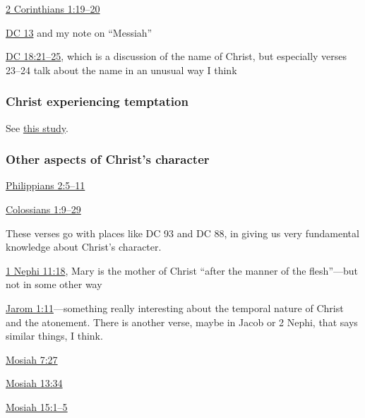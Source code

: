 		\begin{compactitem}
			\item \hyperref[2CORINTHIANS-1-19]{2 Corinthians 1:19--20}
			\item \hyperref[DC13]{DC 13} and my note on ``Messiah''
			\item \hyperref[DC18-21]{DC 18:21--25}, which is a discussion of the name of Christ, but especially verses 23--24 talk about the name in an unusual way I think
		\end{compactitem}
		
	\subsubsection{Christ experiencing temptation}
	
		See \hyperref[TEMPTATION-christ]{this study}.
		
	\subsubsection{Other aspects of Christ's character}
		\label{CHRIST-character}
		
		\begin{compactitem}
			\item \hyperref[PHILIPPIANS-2-5]{Philippians 2:5--11}
			\item \hyperref[COLOSSIANS-1-9]{Colossians 1:9--29}
				\begin{compactitem}
					\item These verses go with places like DC 93 and DC 88, in giving us very fundamental knowledge about Christ's character.
				\end{compactitem}
			\item \hyperref[1NEPHI-11-18]{1 Nephi 11:18}, Mary is the mother of Christ ``after the manner of the flesh''---but not in some other way
			\item \hyperref[JAROM-1-11]{Jarom 1:11}---something really interesting about the temporal nature of Christ and the atonement. There is another verse, maybe in Jacob or 2 Nephi, that says similar things, I think.
			\item \hyperref[MOSIAH-7-27]{Mosiah 7:27}
			\item \hyperref[MOSIAH-13-34]{Mosiah 13:34}
			\item \hyperref[MOSIAH-15-1]{Mosiah 15:1--5}
		\end{compactitem}